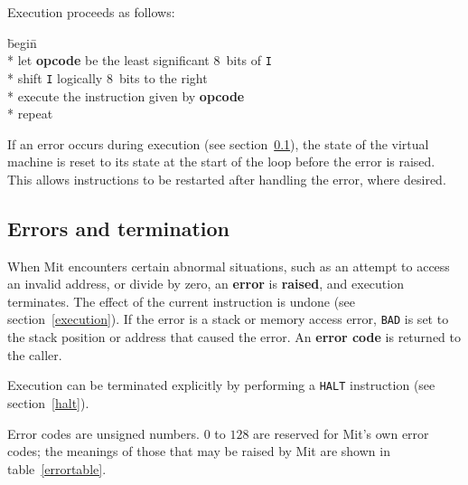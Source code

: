 \documentclass[a4paper]{article}
\newcommand{\instsize}{$8$}
\begin{document}
Execution proceeds as follows:

\begin{tabbing}
\hspace{0.5in}\=begin\=\+\+ \\*
let \textbf{opcode} be the least significant \instsize\ bits of {\tt I} \\*
shift {\tt I} logically \instsize\ bits to the right \\*
execute the instruction given by \textbf{opcode} \- \\*
repeat
\end{tabbing}

If an error occurs during execution (see section~\ref{errors}), the state of the virtual machine is reset to its state at the start of the loop before the error is raised. This allows instructions to be restarted after handling the error, where desired.

\subsection{Errors and termination}
\label{errors}

When Mit encounters certain abnormal situations, such as an attempt to access an invalid address, or divide by zero, an {\bf error} is {\bf raised}, and execution terminates. The effect of the current instruction is undone (see section~\ref{execution}). If the error is a stack or memory access error, {\tt BAD} is set to the stack position or address that caused the error. An {\bf error code} is returned to the caller.

Execution can be terminated explicitly by performing a {\tt HALT} instruction (see section~\ref{halt}).

Error codes are unsigned numbers. $0$ to $128$ are reserved for Mit's own error codes; the meanings of those that may be raised by Mit are shown in table~\ref{errortable}.
\end{document}
